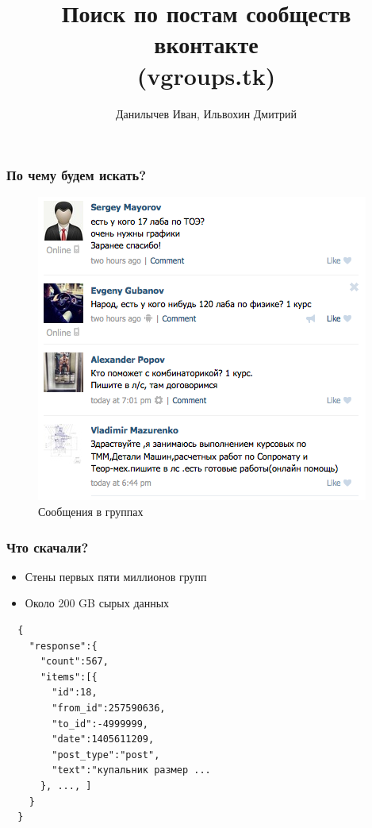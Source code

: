 \documentclass{beamer}
\title[Информационный поиск]{Поиск по постам сообществ вконтакте \\ (vgroups.tk)}
\author{Данилычев Иван, Ильвохин Дмитрий}
\institute{Московский Авиационый Институт}
\date{}
\begin{document}
\newcommand{\errorband}[5][]
{ %
\pgfplotstableread[col sep=comma, skip first n=1]{#2}\datatable
  \addplot [draw=none, stack plots=y, forget plot] table
  [
      x={#3},
      y expr=\thisrow{#4}-2*\thisrow{#5}
  ] {\datatable};

  \addplot [draw=none, fill=gray!40, stack plots=y, area legend, #1] table
  [
      x={#3},
      y expr=4*\thisrow{#5}
  ] {\datatable} \closedcycle;

  \addplot [forget plot, stack plots=y,draw=none] table [x={#3}, y expr=-(\thisrow{#4}+2*\thisrow{#5})] {\datatable};
}

\begin{frame}
  \titlepage
\end{frame}

\begin{frame}
  \frametitle{По чему будем искать?}
    \begin{figure}[!htb]
      \centering
      \includegraphics[scale=0.35]{pics/posts.png}
      \caption{Сообщения в группах}
      \label{fig:posts}
    \end{figure}
\end{frame}

\begin{frame}[fragile]
  \frametitle{Что скачали?}
  \begin{itemize}
    \item Стены первых пяти миллионов групп
    \item Около 200 GB сырых данных
  \end{itemize}

\begin{verbatim}
  {
    "response":{
      "count":567,
      "items":[{
        "id":18,
        "from_id":257590636,
        "to_id":-4999999,
        "date":1405611209,
        "post_type":"post",
        "text":"купальник размер ...
      }, ..., ]
    }
  }
\end{verbatim}

\end{frame}
\end{document}
